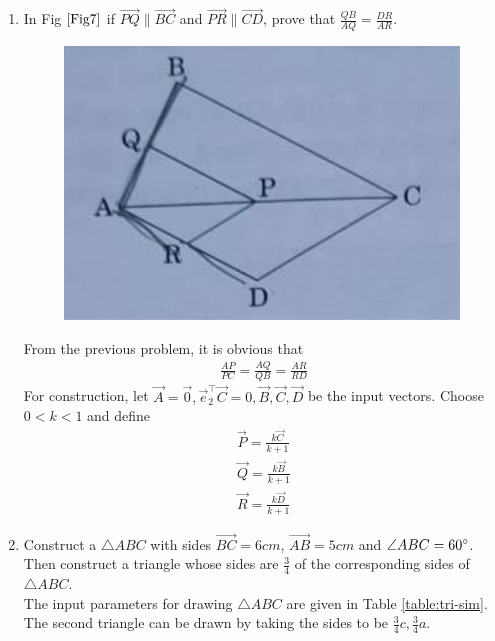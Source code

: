 \documentclass[journal,12pt,twocolumn]{IEEEtran}
\begin{document}
\begin{enumerate}
    \item In Fig $\ref{Fig7}$ if $\vec{PQ} \parallel \vec{BC}$ and $\vec{PR} \parallel \vec{CD}$, prove that $\frac{QB}{AQ} = \frac{DR}{AR}$.\\
    \begin{figure}[h!]
        \centering
        \includegraphics[width=0.5\columnwidth]{Fig7.png}
    	\caption{}
    	\label{Fig7}
     \end{figure}
\solution
From the previous problem, it is obvious that 
\begin{align}
	\frac{AP}{PC}= 
	\frac{AQ}{QB}= 
	\frac{AR}{RD}
\end{align}
For construction, let $\vec{A} = \vec{0}, \vec{e}_2^{\top}\vec{C} = 0, \vec{B}, \vec{C}, \vec{D} $ be the input vectors.  Choose $0 < k < 1$ and define
\begin{align}
	\vec{P} = \frac{
	k\vec{C}
	}{k+1}
	\\
	\vec{Q} = \frac{
	k\vec{B}
	}{k+1}
	\\
	\vec{R} = \frac{
	k\vec{D}
	}{k+1}
\end{align}
    \item Construct a $\triangle ABC$ with sides $\vec{BC}=6cm$, $\vec{AB} = 5cm$ and $\angle{ABC} = 60\degree$. Then construct a triangle whose sides are $\frac{3}{4}$ of the corresponding sides of $\triangle ABC$.\\
	    \solution The input parameters for drawing $\triangle ABC$ are given in Table 
\eqref{table:tri-sim}.  The second triangle can be drawn by taking the sides to be $\frac{3}{4}c, \frac{3}{4}a$.
\begin{table}[ht!]
	
\caption{}
\label{table:tri-sim}	
\end{table}
    

\end{enumerate}
\end{document}
